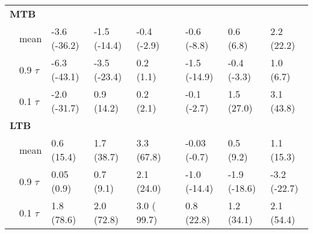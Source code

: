 \documentclass[letterpaper,12pt,oneside]{article}\usepackage[]{graphicx}\usepackage[]{color}
\begin{document}
\begin{table}[!tbp]
\begin{center}
\begin{tabular}{llllclll}
\hline
{\bfseries MTB}&&&&&&&\tabularnewline
~~mean&-3.6 {\footnotesize (-36.2)}&-1.5 {\footnotesize (-14.4)}&-0.4 {\footnotesize (-2.9)}&&-0.6 {\footnotesize (-8.8)}&0.6 {\footnotesize (6.8)}&2.2 {\footnotesize (22.2)}\tabularnewline
~~0.9 $\tau$&-6.3 {\footnotesize (-43.1)}&-3.5 {\footnotesize (-23.4)}&0.2 {\footnotesize (1.1)}&&-1.5 {\footnotesize (-14.9)}&-0.4 {\footnotesize (-3.3)}&1.0 {\footnotesize (6.7)}\tabularnewline
~~0.1 $\tau$&-2.0 {\footnotesize (-31.7)}&0.9 {\footnotesize (14.2)}&0.2 {\footnotesize (2.1)}&&-0.1 {\footnotesize (-2.7)}&1.5 {\footnotesize (27.0)}&3.1 {\footnotesize (43.8)}\tabularnewline
\hline
{\bfseries LTB}&&&&&&&\tabularnewline
~~mean&0.6 {\footnotesize (15.4)}&1.7 {\footnotesize (38.7)}&3.3 {\footnotesize (67.8)}&&-0.03 {\footnotesize (-0.7)}&0.5 {\footnotesize (9.2)}&1.1 {\footnotesize (15.3)}\tabularnewline
~~0.9 $\tau$&0.05 {\footnotesize (0.9)}&0.7 {\footnotesize (9.1)}&2.1 {\footnotesize (24.0)}&&-1.0 {\footnotesize (-14.4)}&-1.9 {\footnotesize (-18.6)}&-3.2 {\footnotesize (-22.7)}\tabularnewline
~~0.1 $\tau$&1.8 {\footnotesize (78.6)}&2.0 {\footnotesize (72.8)}&3.0 {\footnotesize ( 99.7)}&&0.8 {\footnotesize (22.8)}&1.2 {\footnotesize (34.1)}&2.1 {\footnotesize (54.4)}\tabularnewline
\hline
\end{tabular}
\end{center}
\end{table}
\end{document}
